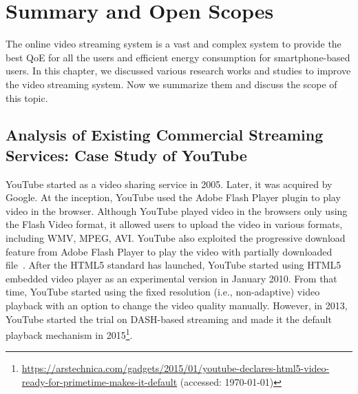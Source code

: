 \section{Summary and Open Scopes}
The online video streaming system is a vast and complex system to provide the best QoE for all the users and efficient energy consumption for smartphone-based users. In this chapter, we discussed various research works and studies to improve the video streaming system. Now we summarize them and discuss the scope of this topic.

\subsection{Analysis of Existing Commercial Streaming Services: Case Study of YouTube}
YouTube started as a video sharing service in 2005. Later, it was acquired by Google. At the inception, YouTube used the Adobe Flash Player plugin to play video in the browser. Although YouTube played video in the browsers only using the Flash Video format, it allowed users to upload the video in various formats, including WMV, MPEG, AVI. YouTube also exploited the progressive download feature from Adobe Flash Player to play the video with partially downloaded file~\cite{gill2007youtube}. After the HTML5 standard has launched, YouTube started using HTML5 embedded video player as an experimental version in January 2010. From that time, YouTube started using the fixed resolution (i.e., non-adaptive) video playback with an option to change the video quality manually. However, in 2013, YouTube started the trial on DASH-based streaming and made it the default playback mechanism in 2015\footnote{\url{https://arstechnica.com/gadgets/2015/01/youtube-declares-html5-video-ready-for-primetime-makes-it-default} (accessed: \today)}.

